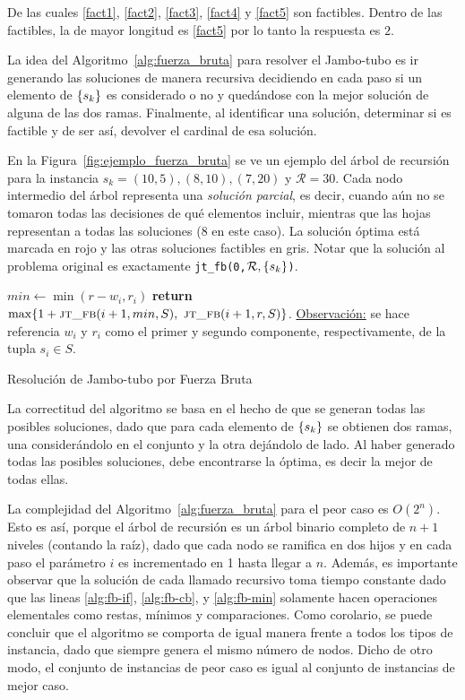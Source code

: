 \documentclass{article}
\DeclarePairedDelimiter\curl{\{}{\}}
\newcommand{\Res}{\mathcal{R}}
\begin{document}
De las cuales \ref{fact1}, \ref{fact2}, \ref{fact3}, \ref{fact4} y  \ref{fact5} son factibles. Dentro de las factibles, la de mayor longitud es \ref{fact5} por lo tanto la respuesta es $2$.

La idea del Algoritmo~\ref{alg:fuerza_bruta} para resolver el Jambo-tubo es ir generando las soluciones de manera recursiva decidiendo en cada paso si un elemento de $\curl{s_{k}}$ es considerado o no y quedándose con la mejor solución de alguna de las dos ramas. Finalmente, al identificar una solución, determinar si es factible y de ser así, devolver el cardinal de esa solución.

En la Figura~\ref{fig:ejemplo_fuerza_bruta} se ve un ejemplo del árbol de recursión para la instancia $s_{k} =(10,5),(8,10),(7,20)$ y $\Res=30$. Cada nodo intermedio del árbol representa una \emph{solución parcial}, es decir, cuando aún no se tomaron todas las decisiones de qué elementos incluir, mientras que las hojas representan a todas las soluciones (8 en este caso). La solución óptima  está marcada en rojo y las otras soluciones factibles en gris. Notar que la solución al problema original es exactamente \texttt{jt\_fb(0,$\Res,\curl{s_{k}}$)}.

\begin{algorithm}
\begin{algorithmic}[1]
     \label{alg:fb-if}
         \label{alg:fb-cb}
    \EndIf
    \State $min \gets \min(r-w_i, r_i)$ \label{alg:fb-min}
    \State \textbf{return} $\max \{ 1 + \textsc{jt\_fb}(i+1, min, S),\ \textsc{jt\_fb}(i+1, r, S) \}$.
\EndFunction
\Statex \underline{Observación:} se hace referencia $w_i$ y $r_i$ como el primer y segundo componente, respectivamente, de la tupla $s_i \in S$.  
\end{algorithmic}
\caption{Resolución de Jambo-tubo por Fuerza Bruta}
\label{alg:fuerza_bruta}

\end{algorithm}

La correctitud del algoritmo se basa en el hecho de que se generan todas las posibles soluciones, dado que para cada elemento de $\curl{s_k}$ se obtienen dos ramas, una considerándolo en el conjunto y la otra dejándolo de lado. Al haber generado todas las posibles soluciones, debe encontrarse la óptima, es decir la mejor de todas ellas.

La complejidad del Algoritmo~\ref{alg:fuerza_bruta} para el peor caso es $O(2^n)$. Esto es así, porque el árbol de recursión es un árbol binario completo de $n+1$ niveles (contando la raíz), dado que cada nodo se ramifica en dos hijos y en cada paso el parámetro $i$ es incrementado en 1 hasta llegar a $n$. Además, es importante observar que la solución de cada llamado recursivo toma tiempo constante dado que las lineas \ref{alg:fb-if}, \ref{alg:fb-cb}, y \ref{alg:fb-min} solamente hacen operaciones elementales como restas, mínimos y comparaciones. Como corolario, se puede concluir que el algoritmo se comporta de igual manera frente a todos los tipos de instancia, dado que siempre genera el mismo número de nodos. Dicho de otro modo, el conjunto de instancias de peor caso es igual al conjunto de instancias de mejor caso. 
\end{document}
